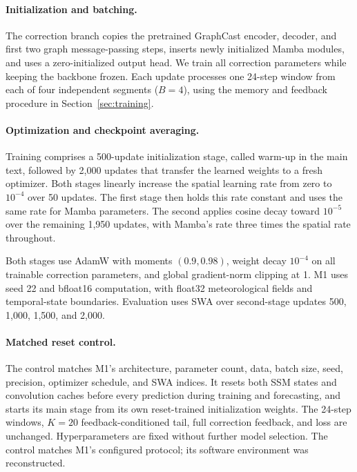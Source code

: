 \documentclass{article}
\newcommand{\vfourchange}[1]{{\color{blue}#1}}
\newcommand{\vfourred}[1]{{\color{red}#1}}
\newif\ifvfivechanges
\newcommand{\vfiveidentity}[1]{#1}
\DeclareRobustCommand{\vfiveadded}[1]{\ifvfivechanges{\color{vfiveAdded}%
  \let\vfourchange\vfiveidentity\let\vfourred\vfiveidentity#1}\else{\color{blue}%
  \let\vfourchange\vfiveidentity\let\vfourred\vfiveidentity#1}\fi}
\DeclareRobustCommand{\vfiveRone}[1]{\ifvfivechanges{\color{vfiveDeleted}\sout{#1}}\,\fi\vfiveadded{R1}}
\begin{document}
\paragraph{\vfourchange{Initialization and batching.}}
\vfourchange{The correction branch copies the pretrained GraphCast encoder, decoder, and first two graph message-passing steps, inserts newly initialized Mamba modules, and uses a zero-initialized output head. We train all correction parameters while keeping the backbone frozen. Each update processes one 24-step window from each of four independent segments ($B=4$), using the memory and feedback procedure in Section~\ref{sec:training}.}

\paragraph{\vfourchange{Optimization and checkpoint averaging.}}
\vfourchange{Training comprises a 500-update initialization stage, called warm-up in the main text, followed by 2,000 updates that transfer the learned weights to a fresh optimizer. Both stages linearly increase the spatial learning rate from zero to $10^{-4}$ over 50 updates. The first stage then holds this rate constant and uses the same rate for Mamba parameters. The second applies cosine decay toward $10^{-5}$ over the remaining 1,950 updates, with Mamba's rate three times the spatial rate throughout.}

\vfourchange{Both stages use AdamW with moments $(0.9,0.98)$, weight decay $10^{-4}$ on all trainable correction parameters, and global gradient-norm clipping at 1. M1 uses seed 22 and bfloat16 computation, with float32 meteorological fields and temporal-state boundaries. Evaluation uses SWA over second-stage updates 500, 1,000, 1,500, and 2,000.}

\paragraph{\vfourchange{Matched reset control.}}
\vfourchange{The \vfiveRone{reset/reset} control matches M1's architecture, parameter count, data, batch size, seed, precision, optimizer schedule, and SWA indices. It resets both SSM states and convolution caches before every prediction during training and forecasting, and starts its main stage from its own reset-trained initialization weights. The 24-step windows, $K=20$ feedback-conditioned tail, full correction feedback, and loss are unchanged. Hyperparameters are fixed without further model selection. The control matches M1's configured protocol; its software environment was reconstructed.}
\end{document}
